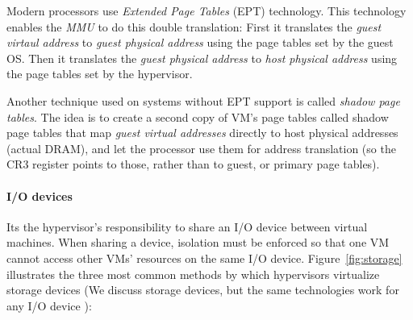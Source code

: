 Modern processors use \emph{Extended Page Tables} (EPT) technology. This technology enables the \emph{MMU} to do this double translation: First it translates the \emph{guest virtaul address} to \emph{guest physical address} using the page tables set by the guest OS. Then it translates the \emph{guest physical address} to \emph{host physical address} using the page tables set by the hypervisor.

Another technique used on systems without EPT support is called \emph{shadow page tables}. The idea is to create a second copy of VM's page tables called shadow page tables that map \emph{guest virtual addresses} directly to host physical addresses (actual DRAM), and let the processor use them for address translation (so the CR3 register points to those, rather than to guest, or primary page tables).

\paragraph {I/O devices}
Its the hypervisor's responsibility to share an I/O device between virtual machines. When sharing a device, isolation must be enforced so that one VM cannot access other VMs' resources on the same I/O device.
Figure~\ref{fig:storage} illustrates the three most common methods by which hypervisors virtualize storage devices (We discuss storage devices, but the same technologies work for any I/O device ):

